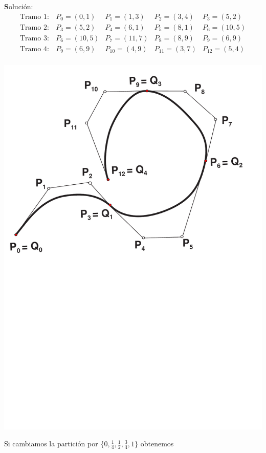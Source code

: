 \documentclass[ebook,oneside]{memoir}
\begin{document}
{\textbf Soluci\'{o}n:}
$$\begin{array}{ccccc} \mbox{Tramo }1:&
P_0=(0,1)& P_1=(1,3)& P_2=(3,4)& P_3=(5,2)\\ \mbox{Tramo }2:&
P_3=(5,2)& P_4=(6,1)& P_5=(8,1)& P_6=(10,5)\\ \mbox{Tramo }3:&
P_6=(10,5)& P_7=(11,7)& P_8=(8,9)& P_9=(6,9)\\ \mbox{Tramo }4:&
P_9=(6,9)& P_{10}=(4,9)& P_{11}=(3,7)& P_{12}=(5,4)\\
\end{array}$$

\vspace{0.3cm}

\begin{center}
\includegraphics[scale=0.45]{3_28.pdf}
\end{center}

Si cambiamos la partici\'{o}n por $\{0,\frac{1}{4},\frac{1}{2}, \frac{3}{4},1\}$ obtenemos
\end{document}
